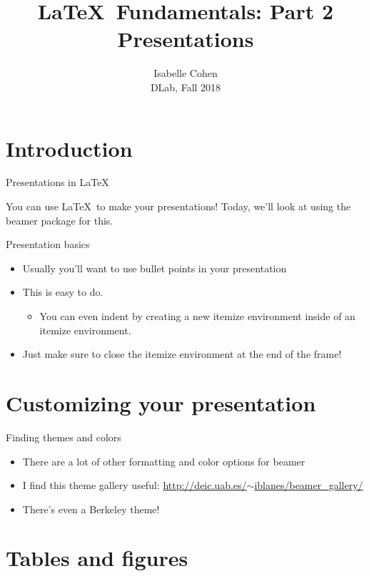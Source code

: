 \documentclass{beamer}
\title{\LaTeX\ Fundamentals: Part 2 \\
	Presentations }
\date{} %
\author{Isabelle Cohen \\
DLab, Fall 2018}
\begin{document}

\maketitle
\clearpage
\tableofcontents
\clearpage
\section{Introduction}
\begin{frame}{Presentations in \LaTeX}

You can use \LaTeX\ to make your presentations! Today, we'll look at using the beamer package for this.

\end{frame}

\begin{frame}{Presentation basics}
\begin{itemize}
\item Usually you'll want to use bullet points in your presentation
\item This is easy to do.
\begin{itemize}
\item You can even indent by creating a new itemize environment inside of an itemize environment.
\end{itemize}
\item Just make sure to close the itemize environment at the end of the frame!
\end{itemize}
\end{frame}

\section{Customizing your presentation}

\begin{frame}{Finding themes and colors}
\begin{itemize}
\item There are a lot of other formatting and color options for beamer
\pause
\item I find this theme gallery useful: \href{http://deic.uab.es/~iblanes/beamer_gallery/}{http://deic.uab.es/$\sim$iblanes/beamer\_gallery/}
\pause
\item There's even a Berkeley theme!
\end{itemize}
\end{frame}

\section{Tables and figures}
\end{document}

